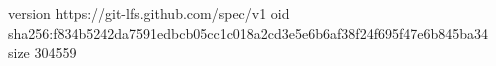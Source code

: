 version https://git-lfs.github.com/spec/v1
oid sha256:f834b5242da7591edbcb05cc1c018a2cd3e5e6b6af38f24f695f47e6b845ba34
size 304559

